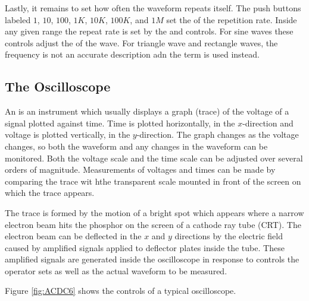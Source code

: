 \noindent Lastly, it remains to set how often the waveform repeats itself. The push buttons labeled $1$, $10$, $100$, $1K$, $10K$, $100K$, and $1M$ set the  of the repetition rate. Inside any given range the repeat rate is set by the  and  controls. For sine waves these controls adjust the  of the wave. For triangle wave and rectangle waves, the frequency is not an accurate description adn the term  is used instead.

\subsection{The Oscilloscope}

An  is an instrument which usually displays a graph (trace) of the voltage of a signal plotted against time. Time is plotted horizontally, in the $x$-direction and voltage is plotted vertically, in the $y$-direction. The graph changes as the voltage changes, so both the waveform and any changes in the waveform can be monitored. Both the voltage scale and the time scale can be adjusted over several orders of magnitude. Measurements of voltages and times can be made by comparing the trace wit hthe transparent scale mounted in front of the screen on which the trace appears.

\noindent The trace is formed by the motion of a bright spot which appears where a narrow electron beam hits the phosphor on the screen of a cathode ray tube (CRT). The electron beam can be deflected in the $x$ and $y$ directions by the electric field caused by amplified signals applied to deflector plates inside the tube. These amplified signals are generated inside the oscilloscope in response to controls the operator sets as well as the actual waveform to be measured.

\noindent Figure \ref{fig:ACDC6} shows the controls of a typical oscilloscope.

